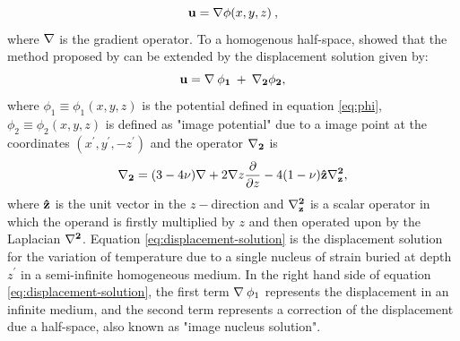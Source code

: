 \documentclass[P]{BrJG_submit}
\begin{document}
\begin{equation}
{\bf{u}} = {\bf {\nabla}} \phi(x,y,z) \: ,
\label{eq:displacement-general}
\end{equation}
where $\bf{\nabla}$ is the gradient operator.  
To a homogenous half-space, \citet{Mindlin-Cheng50} showed that the method proposed by  \citet{Goodier37} can be extended by the displacement solution given by:
\begin{equation}
\bf{u} = {\bf{\nabla}} \: \phi_{1} \: + \: {\bf{{\nabla}_{2}}} \phi_{2}, 
\label{eq:displacement-solution}
\end{equation}
where $\phi_{1} \equiv \phi_{1}(x,y,z)$ is the potential defined in equation \ref{eq:phi}, 
$\phi_{2} \equiv  \phi_{2}(x,y,z)$
is defined as "image potential" \citep{Segall92} due to a image point at the coordinates
$(x^{\prime}, y^{\prime}, -z^{\prime} )$ and the operator $\bf{{\nabla}_{2}}$ is
\begin{equation}
{\bf{{\nabla}_{2}}} = (3 - 4\nu){\bf{\nabla}} + 2 {\bf{\nabla}} z \frac{\partial }{\partial z}  - 4(1- \nu){\bf{\hat{z}}} {\bf{{\nabla}^{2}_{z}}},
\label{eq:nabla2}
\end{equation}
where ${\bf{\hat{z}}}$ is the unit vector in the $z-$direction and 
${\bf{{\nabla}^{2}_{z}}}$ is a scalar operator in which the operand is firstly
multiplied by $z$ and then operated upon by the Laplacian ${\bf{\nabla}^{2}}$. 
Equation \ref{eq:displacement-solution} is the displacement solution for the variation of temperature due to a single nucleus of strain buried at depth $z^{\prime}$ in a
semi-infinite homogeneous medium. 
In the right hand side of equation \ref{eq:displacement-solution}, the first term 
$ {\bf{\nabla}} \: \phi_{1} $ represents the displacement in an infinite medium, and the second term represents a correction of the displacement due a half-space, also known as "image nucleus solution".
\end{document}
